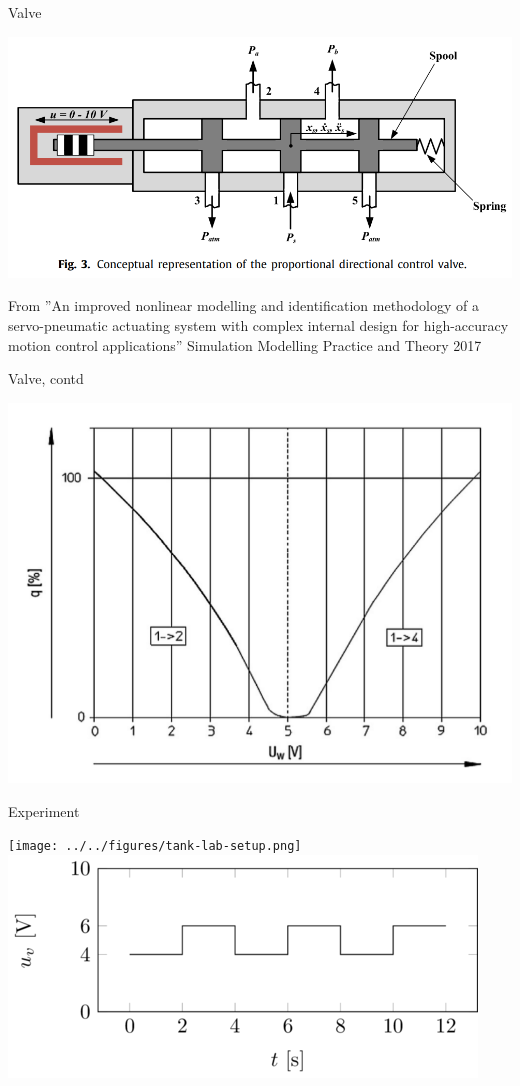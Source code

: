 \documentclass[presentation,aspectratio=1610]{beamer}
\begin{document}
\begin{frame}[label={sec:org19a4887}]{Valve}
\begin{center}
\includegraphics[width=\linewidth]{../../figures/proportional-directional-control-valve-concept.png}
\end{center}
\begin{LATEX}
  \tiny From ''An improved nonlinear modelling and identification
methodology of a servo-pneumatic actuating system with
complex internal design for high-accuracy motion control
applications'' Simulation Modelling Practice and Theory 2017
\end{LATEX}
\end{frame}

\begin{frame}[label={sec:org1059008}]{Valve, contd}
\begin{center}
\includegraphics[width=0.7\linewidth]{../../figures/valve-volt-opening.png}
\end{center}
\end{frame}

\begin{frame}[label={sec:org402cb77}]{Experiment}
\begin{center}
\texttt{[image: ../../figures/tank-lab-setup.png]}
\includegraphics[width=0.35\linewidth]{../../figures/square-wave-pressure-valve.png}
\end{center}
\end{frame}
\end{document}
